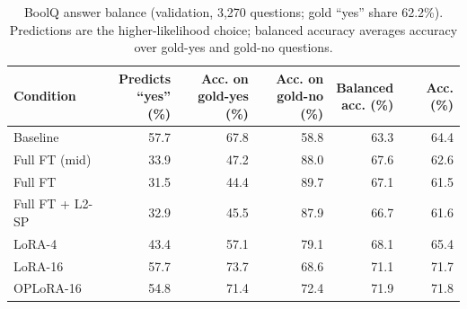 \begin{table}[t]
\centering
\small
\caption{BoolQ answer balance (validation, 3,270 questions; gold “yes” share 62.2\%). Predictions are the higher-likelihood choice; balanced accuracy averages accuracy over gold-yes and gold-no questions.}
\label{tab:t1-boolq}
\begin{tabular}{lrrrrr}
\toprule
Condition & \makecell{Predicts\\“yes” (\%)} & \makecell{Acc. on\\gold-yes (\%)} & \makecell{Acc. on\\gold-no (\%)} & \makecell{Balanced\\acc. (\%)} & Acc. (\%) \\
\midrule
Baseline & 57.7 & 67.8 & 58.8 & 63.3 & 64.4 \\
Full FT (mid) & 33.9 & 47.2 & 88.0 & 67.6 & 62.6 \\
Full FT & 31.5 & 44.4 & 89.7 & 67.1 & 61.5 \\
Full FT + L2-SP & 32.9 & 45.5 & 87.9 & 66.7 & 61.6 \\
LoRA-4 & 43.4 & 57.1 & 79.1 & 68.1 & 65.4 \\
LoRA-16 & 57.7 & 73.7 & 68.6 & 71.1 & 71.7 \\
OPLoRA-16 & 54.8 & 71.4 & 72.4 & 71.9 & 71.8 \\
\bottomrule
\end{tabular}
\end{table}
